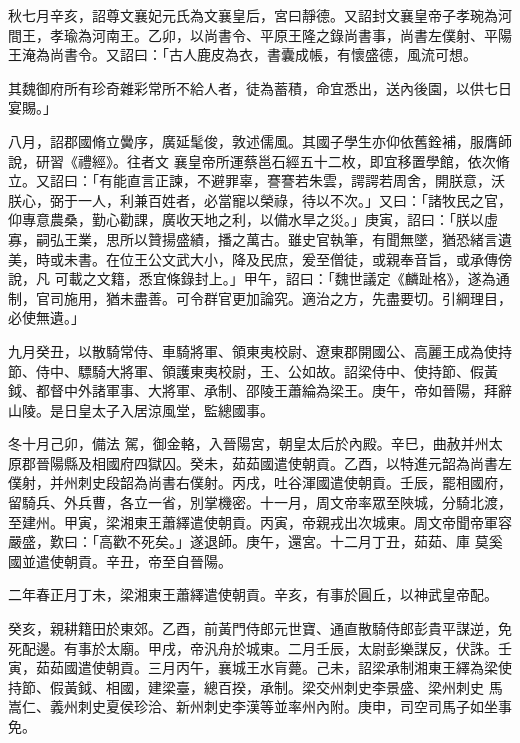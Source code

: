 \begin{pinyinscope}
 秋七月辛亥，詔尊文襄妃元氏為文襄皇后，宮曰靜德。又詔封文襄皇帝子孝琬為河間王，孝瑜為河南王。乙卯，以尚書令、平原王隆之錄尚書事，尚書左僕射、平陽王淹為尚書令。又詔曰：「古人鹿皮為衣，書囊成帳，有懷盛德，風流可想。



 其魏御府所有珍奇雜彩常所不給人者，徒為蓄積，命宜悉出，送內後園，以供七日宴賜。」



 八月，詔郡國脩立黌序，廣延髦俊，敦述儒風。其國子學生亦仰依舊銓補，服膺師說，研習《禮經》。往者文
 襄皇帝所運蔡邕石經五十二枚，即宜移置學館，依次脩立。又詔曰：「有能直言正諫，不避罪辜，謇謇若朱雲，諤諤若周舍，開朕意，沃朕心，弼于一人，利兼百姓者，必當寵以榮祿，待以不次。」又曰：「諸牧民之官，仰專意農桑，勤心勸課，廣收天地之利，以備水旱之災。」庚寅，詔曰：「朕以虛寡，嗣弘王業，思所以贊揚盛績，播之萬古。雖史官執筆，有聞無墜，猶恐緒言遺美，時或未書。在位王公文武大小，降及民庶，爰至僧徒，或親奉音旨，或承傳傍說，凡
 可載之文籍，悉宜條錄封上。」甲午，詔曰：「魏世議定《麟趾格》，遂為通制，官司施用，猶未盡善。可令群官更加論究。適治之方，先盡要切。引綱理目，必使無遺。」



 九月癸丑，以散騎常侍、車騎將軍、領東夷校尉、遼東郡開國公、高麗王成為使持節、侍中、驃騎大將軍、領護東夷校尉，王、公如故。詔梁侍中、使持節、假黃鉞、都督中外諸軍事、大將軍、承制、邵陵王蕭綸為梁王。庚午，帝如晉陽，拜辭山陵。是日皇太子入居涼風堂，監總國事。



 冬十月己卯，備法
 駕，御金輅，入晉陽宮，朝皇太后於內殿。辛巳，曲赦并州太原郡晉陽縣及相國府四獄囚。癸未，茹茹國遣使朝貢。乙酉，以特進元韶為尚書左僕射，并州刺史段韶為尚書右僕射。丙戌，吐谷渾國遣使朝貢。壬辰，罷相國府，留騎兵、外兵曹，各立一省，別掌機密。十一月，周文帝率眾至陜城，分騎北渡，至建州。甲寅，梁湘東王蕭繹遣使朝貢。丙寅，帝親戎出次城東。周文帝聞帝軍容嚴盛，歎曰：「高歡不死矣。」遂退師。庚午，還宮。十二月丁丑，茹茹、庫
 莫奚國並遣使朝貢。辛丑，帝至自晉陽。



 二年春正月丁未，梁湘東王蕭繹遣使朝貢。辛亥，有事於圓丘，以神武皇帝配。



 癸亥，親耕籍田於東郊。乙酉，前黃門侍郎元世寶、通直散騎侍郎彭貴平謀逆，免死配邊。有事於太廟。甲戌，帝汎舟於城東。二月壬辰，太尉彭樂謀反，伏誅。壬寅，茹茹國遣使朝貢。三月丙午，襄城王水肓薨。己未，詔梁承制湘東王繹為梁使持節、假黃鉞、相國，建梁臺，總百揆，承制。梁交州刺史李景盛、梁州刺史
 馬嵩仁、義州刺史夏侯珍洽、新州刺史李漢等並率州內附。庚申，司空司馬子如坐事免。




\end{pinyinscope}
